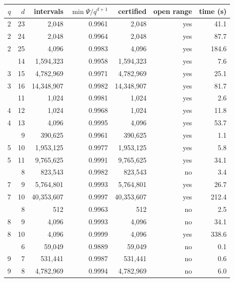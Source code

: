 \begin{tabular}{rrrrrrr}
\toprule
$q$ & $d$ & intervals & $\min\Psi/q^{d+1}$ & certified & open range & time (s) \\
\midrule
2 & 23 & 2{,}048 & 0.9961 & 2{,}048 & yes & 41.1 \\
2 & 24 & 2{,}048 & 0.9964 & 2{,}048 & yes & 87.7 \\
2 & 25 & 4{,}096 & 0.9983 & 4{,}096 & yes & 184.6 \\
\addlinespace
3 & 14 & 1{,}594{,}323 & 0.9958 & 1{,}594{,}323 & yes & 7.6 \\
3 & 15 & 4{,}782{,}969 & 0.9971 & 4{,}782{,}969 & yes & 25.1 \\
3 & 16 & 14{,}348{,}907 & 0.9982 & 14{,}348{,}907 & yes & 81.7 \\
\addlinespace
4 & 11 & 1{,}024 & 0.9981 & 1{,}024 & yes & 2.6 \\
4 & 12 & 1{,}024 & 0.9968 & 1{,}024 & yes & 11.8 \\
4 & 13 & 4{,}096 & 0.9995 & 4{,}096 & yes & 53.7 \\
\addlinespace
5 & 9 & 390{,}625 & 0.9961 & 390{,}625 & yes & 1.1 \\
5 & 10 & 1{,}953{,}125 & 0.9977 & 1{,}953{,}125 & yes & 5.8 \\
5 & 11 & 9{,}765{,}625 & 0.9991 & 9{,}765{,}625 & yes & 34.1 \\
\addlinespace
7 & 8 & 823{,}543 & 0.9982 & 823{,}543 & no & 3.4 \\
7 & 9 & 5{,}764{,}801 & 0.9993 & 5{,}764{,}801 & yes & 26.7 \\
7 & 10 & 40{,}353{,}607 & 0.9997 & 40{,}353{,}607 & yes & 212.4 \\
\addlinespace
8 & 8 & 512 & 0.9963 & 512 & no & 2.5 \\
8 & 9 & 4{,}096 & 0.9993 & 4{,}096 & no & 34.1 \\
8 & 10 & 4{,}096 & 0.9999 & 4{,}096 & yes & 338.6 \\
\addlinespace
9 & 6 & 59{,}049 & 0.9889 & 59{,}049 & no & 0.1 \\
9 & 7 & 531{,}441 & 0.9987 & 531{,}441 & no & 0.6 \\
9 & 8 & 4{,}782{,}969 & 0.9994 & 4{,}782{,}969 & no & 6.0 \\
\bottomrule
\end{tabular}